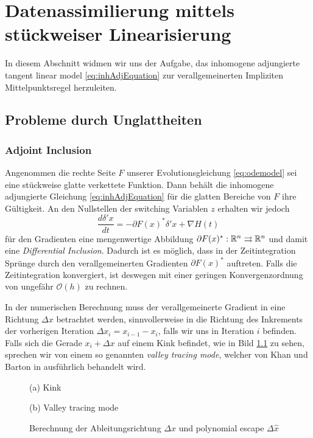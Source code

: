 % 
\chapter{Datenassimilierung mittels stückweiser Linearisierung}
In diesem Abschnitt widmen wir uns der Aufgabe, das inhomogene adjungierte tangent linear model \eqref{eq:inhAdjEquation} zur verallgemeinerten Impliziten Mittelpunktsregel herzuleiten.
\section{Probleme durch Unglattheiten}
\subsection{Adjoint Inclusion}
\label{sec:adjointInclusion}
Angenommen die rechte Seite $F$ unserer Evolutionsgleichung \eqref{eq:odemodel} sei eine stückweise glatte verkettete Funktion. Dann behält die inhomogene adjungierte Gleichung \eqref{eq:inhAdjEquation} für die glatten Bereiche von $F$ ihre Gültigkeit. An den Nullstellen der switching Variablen $z$ erhalten wir jedoch
\begin{equation}
 \label{eq:adjInclusion}
 \frac{d \delta' x}{dt} =- \partial F(x)^*\delta'x + \nabla H(t)
\end{equation}
für den Gradienten eine mengenwertige Abbildung $\partial F(x)^*:\mathbb{R}^n\rightrightarrows \mathbb{R}^n$ und damit eine \textit{Differential Inclusion}.
Dadurch ist es möglich, dass in der Zeitintegration Sprünge durch den verallgemeinerten Gradienten $\partial F(x)^*$ auftreten. Falls die Zeitintegration konvergiert, ist deswegen mit einer geringen Konvergenzordnung von ungefähr $\mathcal O(h)$ zu rechnen.

In der numerischen Berechnung muss der verallgemeinerte Gradient in eine Richtung $\Delta x$ betrachtet werden, sinnvollerweise in die Richtung des Inkrements der vorherigen Iteration $\Delta x_i = x_{i-1} - x_i$, falls wir uns in Iteration $i$ befinden. 
Falls sich die Gerade $x_i + \Delta x$ auf einem Kink befindet, wie in Bild \ref{fig:adjValleyTracing} zu sehen, sprechen wir von einem so genannten \textit{valley tracing mode}, welcher von Khan und Barton in \cite{khan2014} ausführlich behandelt wird. 
\begin{figure}
\centering
\begin{minipage}[b]{0.49\linewidth}
\centering

\caption*{(a) Kink}
\end{minipage}
\begin{minipage}[b]{0.49\linewidth}
\centering

\caption*{(b) Valley tracing mode}
\end{minipage}
\caption{Berechnung der Ableitungsrichtung $\Delta x$ und polynomial escape $\Delta \hat x$ }
\label{fig:adjValleyTracing}
\end{figure}

